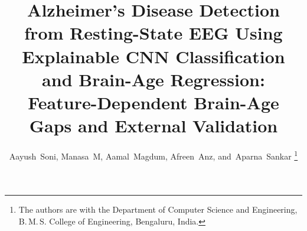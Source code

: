 \documentclass[journal]{IEEEtran}
\begin{document}
\title{Alzheimer's Disease Detection from Resting-State EEG Using Explainable CNN Classification and Brain-Age Regression: Feature-Dependent Brain-Age Gaps and External Validation}

\author{Aayush~Soni, Manasa~M, Aamal~Magdum, Afreen~Anz, and~Aparna~Sankar%
\thanks{The authors are with the Department of Computer Science and Engineering, B.\,M.\,S. College of Engineering, Bengaluru, India.}}

\maketitle

\end{document}
